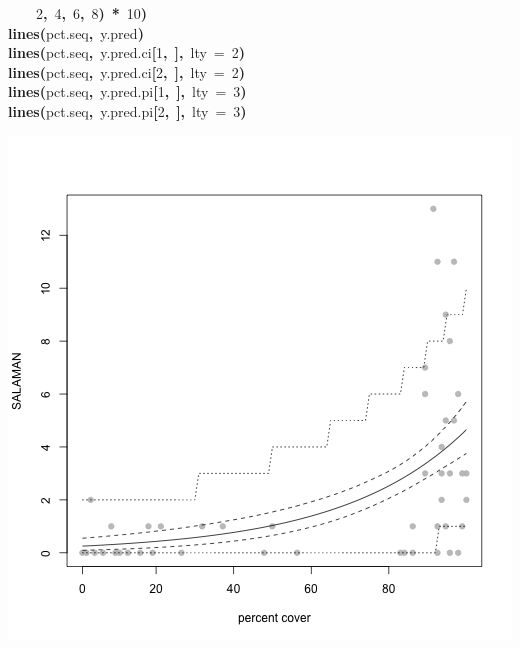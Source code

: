 \documentclass{article}
\makeatletter
\newcommand{\hlnumber}[1]{\textcolor[rgb]{0,0,0}{#1}}%
\newcommand{\hlfunctioncall}[1]{\textcolor[rgb]{.5,0,.33}{\textbf{#1}}}%
\newcommand{\hlkeyword}[1]{\textbf{#1}}%
\newcommand{\hlargument}[1]{\textcolor[rgb]{.69,.25,.02}{#1}}%
\newcommand{\hlsymbol}[1]{#1}%
\newcommand{\hlstd}[1]{\textcolor[rgb]{0,0,0}{#1}}%
\newenvironment{kframe}{%
 \def\FrameCommand##1{\hskip\@totalleftmargin \hskip-\fboxsep
 \colorbox{shadecolor}{##1}\hskip-\fboxsep
     \hskip-\linewidth \hskip-\@totalleftmargin \hskip\columnwidth}%
 \MakeFramed {\advance\hsize-\width
   \@totalleftmargin\z@ \linewidth\hsize
   \@setminipage}}%
 {\par\unskip\endMakeFramed}
\newenvironment{knitrout}{}{} %
\makeatother
\begin{document}
\begin{knitrout}
{\begin{kframe}
\begin{flushleft}
\hlstd{}{\ }{\ }{\ }{\ }\hlnumber{2}\hlkeyword{,}{\ }\hlnumber{4}\hlkeyword{,}{\ }\hlnumber{6}\hlkeyword{,}{\ }\hlnumber{8}\hlkeyword{)}{\ }\hlkeyword{*}{\ }\hlnumber{10}\hlkeyword{)}\hspace*{\fill}\\
\hlstd{}\hlfunctioncall{lines}\hlkeyword{(}\hlsymbol{pct.seq}\hlkeyword{,}{\ }\hlsymbol{y.pred}\hlkeyword{)}\hspace*{\fill}\\
\hlstd{}\hlfunctioncall{lines}\hlkeyword{(}\hlsymbol{pct.seq}\hlkeyword{,}{\ }\hlsymbol{y.pred.ci}\hlkeyword{[}\hlnumber{1}\hlkeyword{,}{\ }\hlkeyword{]}\hlkeyword{,}{\ }\hlargument{lty}{\ }\hlargument{=}{\ }\hlnumber{2}\hlkeyword{)}\hspace*{\fill}\\
\hlstd{}\hlfunctioncall{lines}\hlkeyword{(}\hlsymbol{pct.seq}\hlkeyword{,}{\ }\hlsymbol{y.pred.ci}\hlkeyword{[}\hlnumber{2}\hlkeyword{,}{\ }\hlkeyword{]}\hlkeyword{,}{\ }\hlargument{lty}{\ }\hlargument{=}{\ }\hlnumber{2}\hlkeyword{)}\hspace*{\fill}\\
\hlstd{}\hlfunctioncall{lines}\hlkeyword{(}\hlsymbol{pct.seq}\hlkeyword{,}{\ }\hlsymbol{y.pred.pi}\hlkeyword{[}\hlnumber{1}\hlkeyword{,}{\ }\hlkeyword{]}\hlkeyword{,}{\ }\hlargument{lty}{\ }\hlargument{=}{\ }\hlnumber{3}\hlkeyword{)}\hspace*{\fill}\\
\hlstd{}\hlfunctioncall{lines}\hlkeyword{(}\hlsymbol{pct.seq}\hlkeyword{,}{\ }\hlsymbol{y.pred.pi}\hlkeyword{[}\hlnumber{2}\hlkeyword{,}{\ }\hlkeyword{]}\hlkeyword{,}{\ }\hlargument{lty}{\ }\hlargument{=}{\ }\hlnumber{3}\hlkeyword{)}\mbox{}
\normalfont
\end{flushleft}
\includegraphics{sal-fig1} \begin{flushleft}

\end{flushleft}
\end{kframe}}
\end{knitrout}
\end{document}
